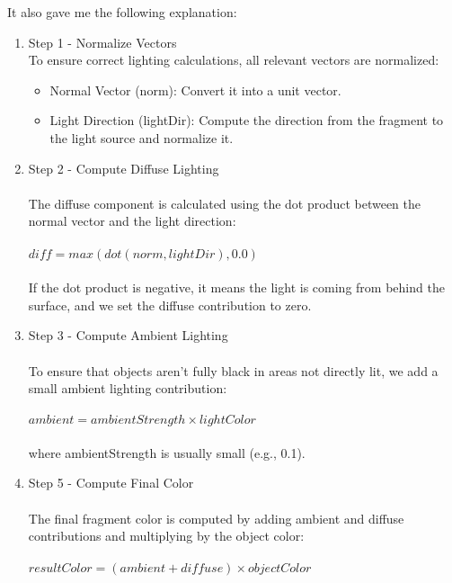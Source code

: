\documentclass{article}
\begin{document}
It also gave me the following explanation:
\begin{enumerate}
    \item Step 1 - Normalize Vectors\\
    To ensure correct lighting calculations, all relevant vectors are normalized: 
    \begin{itemize}
        \item Normal Vector (norm): Convert it into a unit vector.
        \item Light Direction (lightDir): Compute the direction from the fragment to the light source and normalize it.
    \end{itemize}
    \item Step 2 - Compute Diffuse Lighting\\ \\
The diffuse component is calculated using the dot product between the normal vector and the light direction:\\ \\ $diff=max(dot(norm,lightDir),0.0)$\\ \\
If the dot product is negative, it means the light is coming from behind the surface, and we set the diffuse contribution to zero.
    \item Step 3 - Compute Ambient Lighting\\ \\
To ensure that objects aren't fully black in areas not directly lit, we add a small ambient lighting contribution: \\ \\$ambient=ambientStrength×lightColor$ \\ \\
where ambientStrength is usually small (e.g., 0.1).
    \item Step 5 - Compute Final Color\\ \\
The final fragment color is computed by adding ambient and diffuse contributions and multiplying by the object color:\\ \\
$resultColor=(ambient+diffuse)×objectColor$
\end{enumerate}
\end{document}
